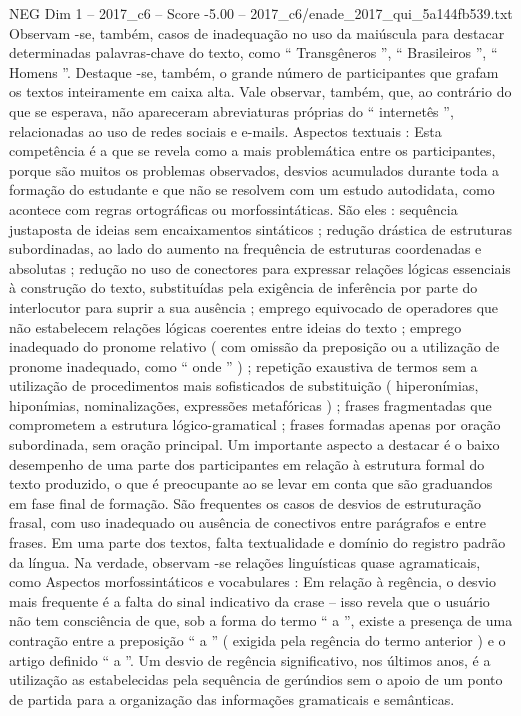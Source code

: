 \begin{textsample}{NEG Dim 1 – 2017\_c6 – Score -5.00 – 2017\_c6/enade\_2017\_qui\_5a144fb539.txt}
Observam -se, também, casos de inadequação no uso da maiúscula para destacar determinadas palavras-chave do texto, como “ Transgêneros ”, “ Brasileiros ”, “ Homens ”.
Destaque -se, também, o grande número de participantes que grafam os textos inteiramente em caixa alta.
Vale observar, também, que, ao contrário do que se esperava, não apareceram abreviaturas próprias do “ internetês ”, relacionadas ao uso de redes sociais e e-mails.
Aspectos textuais : Esta competência é a que se revela como a mais problemática entre os participantes, porque são muitos os problemas observados, desvios acumulados durante toda a formação do estudante e que não se resolvem com um estudo autodidata, como acontece com regras ortográficas ou morfossintáticas.
São eles : sequência justaposta de ideias sem encaixamentos sintáticos ; redução drástica de estruturas subordinadas, ao lado do aumento na frequência de estruturas coordenadas e absolutas ; redução no uso de conectores para expressar relações lógicas essenciais à construção do texto, substituídas pela exigência de inferência por parte do interlocutor para suprir a sua ausência ; emprego equivocado de operadores que não estabelecem relações lógicas coerentes entre ideias do texto ; emprego inadequado do pronome relativo ( com omissão da preposição ou a utilização de pronome inadequado, como “ onde ” ) ; repetição exaustiva de termos sem a utilização de procedimentos mais sofisticados de substituição ( hiperonímias, hiponímias, nominalizações, expressões metafóricas ) ; frases fragmentadas que comprometem a estrutura lógico-gramatical ; frases formadas apenas por oração subordinada, sem oração principal.
Um importante aspecto a destacar é o baixo desempenho de uma parte dos participantes em relação à estrutura formal do texto produzido, o que é preocupante ao se levar em conta que são graduandos em fase final de formação.
São frequentes os casos de desvios de estruturação frasal, com uso inadequado ou ausência de conectivos entre parágrafos e entre frases.
Em uma parte dos textos, falta textualidade e domínio do registro padrão da língua.
Na verdade, observam -se relações linguísticas quase agramaticais, como Aspectos morfossintáticos e vocabulares : Em relação à regência, o desvio mais frequente é a falta do sinal indicativo da crase – isso revela que o usuário não tem consciência de que, sob a forma do termo “ a ”, existe a presença de uma contração entre a preposição “ a ” ( exigida pela regência do termo anterior ) e o artigo definido “ a ”.
Um desvio de regência significativo, nos últimos anos, é a utilização as estabelecidas pela sequência de gerúndios sem o apoio de um ponto de partida para a organização das informações gramaticais e semânticas.

\end{textsample}
